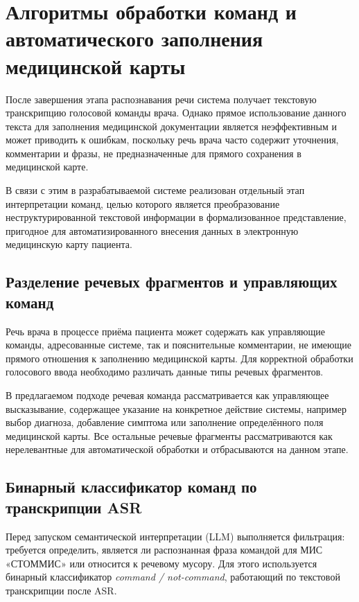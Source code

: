 \clearpage
\section{Алгоритмы обработки команд и автоматического заполнения медицинской карты}
\label{sec:command_processing}

После завершения этапа распознавания речи система получает текстовую транскрипцию голосовой команды врача. Однако прямое использование данного текста для заполнения медицинской документации является неэффективным и может приводить к ошибкам, поскольку речь врача часто содержит уточнения, комментарии и фразы, не предназначенные для прямого сохранения в медицинской карте.

В связи с этим в разрабатываемой системе реализован отдельный этап интерпретации команд, целью которого является преобразование неструктурированной текстовой информации в формализованное представление, пригодное для автоматизированного внесения данных в электронную медицинскую карту пациента.


\subsection{Разделение речевых фрагментов и управляющих команд}

Речь врача в процессе приёма пациента может содержать как управляющие команды, адресованные системе, так и пояснительные комментарии, не имеющие прямого отношения к заполнению медицинской карты. Для корректной обработки голосового ввода необходимо различать данные типы речевых фрагментов.

В предлагаемом подходе речевая команда рассматривается как управляющее высказывание, содержащее указание на конкретное действие системы, например выбор диагноза, добавление симптома или заполнение определённого поля медицинской карты. Все остальные речевые фрагменты рассматриваются как нерелевантные для автоматической обработки и отбрасываются на данном этапе.



\subsection{Бинарный классификатор команд по транскрипции ASR}
Перед запуском семантической интерпретации (LLM) выполняется фильтрация: требуется определить, является ли распознанная фраза командой для МИС «СТОММИС» или относится к речевому мусору.
Для этого используется бинарный классификатор \textit{command / not-command}, работающий по текстовой транскрипции после ASR.


